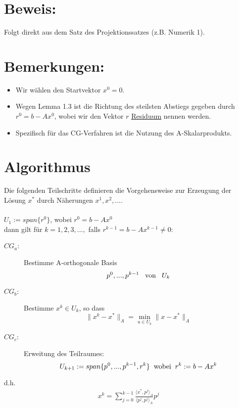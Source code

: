 \documentclass{article}
\begin{document}
\section{Beweis:}
Folgt direkt aus dem Satz des Projektionssatzes (z.B. Numerik 1).

\section{Bemerkungen:}
\begin{itemize}
	\item Wir wählen den Startvektor $x^{0} = 0$.
	\item Wegen Lemma 1.3 ist die Richtung des steilsten Abstiegs gegeben durch $r^{0} = b - Ax^{0}$, wobei wir den Vektor $r$ \underline{Residuum} nennen werden.
	\item Spezifisch für das CG-Verfahren ist die Nutzung des A-Skalarprodukts.
\end{itemize}

\section{Algorithmus}
Die folgenden Teilschritte definieren die Vorgehensweise zur Erzeugung der Lösung $x^{*}$ durch Näherungen $x^{1}, x^{2},...$.
\\\\$U_{1} := span\{r^{0}\}$, wobei $r^{0} = b - Ax^{0}$
\\dann gilt für $k = 1,2,3,...,$ falls $r^{k-1} = b - Ax^{k-1} \ne 0$:
\begin{description}
\item[$CG_{a}$:] Bestimme A-orthogonale Basis
\begin{equation}
p^{0},...,p^{k-1} \hspace{3mm} \textnormal{von} \hspace{3mm} U_{k}
\end{equation}
\item[$CG_{b}$:] Bestimme $x^{k} \in U_{k}$, so dass
\begin{equation}
\|x^{k} - x^{*}\|_{A} = \underset{u \in U_{k}}{\min} \|x - x^{*}\|_{A}
\end{equation}
\item[$CG_{c}$:] Erweitung des Teilraumes:
\begin{equation}
U_{k+1} := span\{p^{0},...,p^{k-1},r^{k}\} \hspace{2mm} \textnormal{wobei} \hspace{2mm} r^{k} := b - Ax^{k}
\end{equation}
\end{description}
d.h.
\begin{align}
x^{k} = \sum_{j=0}^{k-1} \frac {\langle x^{*}, p^{j} \rangle _{A}} {\langle p^{j}, p^{j} \rangle _{A}} p^{j}
\end{align}
\end{document}
